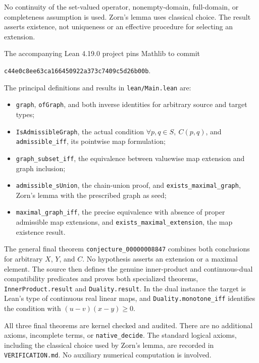 \documentclass[11pt,a4paper]{article}
\begin{document}
No continuity of the set-valued operator, nonempty-domain, full-domain,
or completeness assumption is used. Zorn's lemma uses classical choice.
The result asserts existence, not uniqueness or an effective procedure
for selecting an extension.

The accompanying Lean 4.19.0 project pins Mathlib to commit
\begin{center}\small
\texttt{c44e0c8ee63ca166450922a373c7409c5d26b00b}.
\end{center}
The principal definitions and results in \texttt{lean/Main.lean} are:
\begin{itemize}
\item \texttt{graph}, \texttt{ofGraph}, and both inverse identities for
arbitrary source and target types;
\item \texttt{IsAdmissibleGraph}, the actual condition
$\forall p,q\in S,\ C(p,q)$, and \texttt{admissible\_iff}, its
pointwise map formulation;
\item \texttt{graph\_subset\_iff}, the equivalence between valuewise
map extension and graph inclusion;
\item \texttt{admissible\_sUnion}, the chain-union proof, and
\texttt{exists\_maximal\_graph}, Zorn's lemma with the prescribed graph
as seed;
\item \texttt{maximal\_graph\_iff}, the precise equivalence with absence
of proper admissible map extensions, and
\texttt{exists\_maximal\_extension}, the map existence result.
\end{itemize}

The general final theorem \texttt{conjecture\_00000008847} combines both
conclusions for arbitrary $X$, $Y$, and $C$. No hypothesis asserts an
extension or a maximal element. The source then defines the genuine
inner-product and continuous-dual compatibility predicates and proves
both specialized theorems, \texttt{InnerProduct.result} and
\texttt{Duality.result}. In the dual instance the target is Lean's type
of continuous real linear maps, and \texttt{Duality.monotone\_iff}
identifies the condition with $(u-v)(x-y)\geq0$.

All three final theorems are kernel checked and audited. There are no
additional axioms, incomplete terms, or \texttt{native\_decide}.
The standard logical axioms, including the classical choice used by
Zorn's lemma, are recorded in \texttt{VERIFICATION.md}. No auxiliary
numerical computation is involved.
\end{document}
